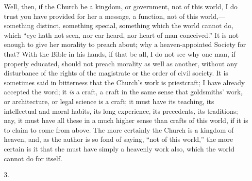 Well, then, if the Church be a kingdom, or government, not of this
world, I do trust you have provided for her a message, a function, not
of this world,—something distinct, something special, something
which the world cannot do, which ``eye hath not seen, nor ear
heard, nor heart of man conceived.'' It is not enough to give her
morality to preach about; why a heaven-appointed Society for that?
With the Bible in his hands, if that be all, I do not see why one man,
if properly educated, should not preach morality as well as another,
without any disturbance of the rights of the magistrate or the order
of civil society. It is sometimes said in bitterness that the Church's
work is priestcraft; I have already accepted the word; it \emph{is} a craft,
a craft in the same sense that goldsmiths' work, or architecture, or
legal science is a craft; it must have its teaching, its intellectual
and moral habits, its long experience, its precedents, its traditions;
nay, it must have all these in a much higher sense than crafts of this
world, if it is to claim to come from above. The more certainly the
Church is a kingdom of heaven, and, as the author is so fond of
saying, ``not of this world,'' the more certain is it that she
must have simply a heavenly work also, which the world cannot do for
itself.

3.

